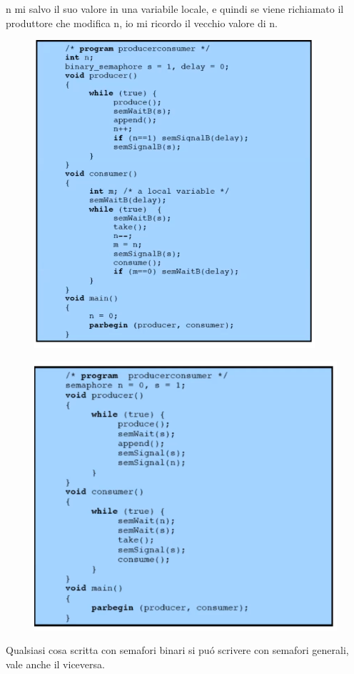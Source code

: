 n mi salvo il suo valore in una variabile locale, e quindi se viene richiamato il produttore che modifica n, io mi ricordo il vecchio valore di n.
\begin{figure}[H]
    \centering
    \includegraphics[width=0.7\linewidth]{immagini/SoluzioneProduttoreConsumatoreCorretta}
\end{figure}
\begin{figure}[H]
    \centering
    \includegraphics[width=0.7\linewidth]{immagini/SoluzioneProduttoreConSemaforiGenerali}
\end{figure}
Qualsiasi cosa scritta con semafori binari si puó scrivere con semafori generali, vale anche il viceversa.
